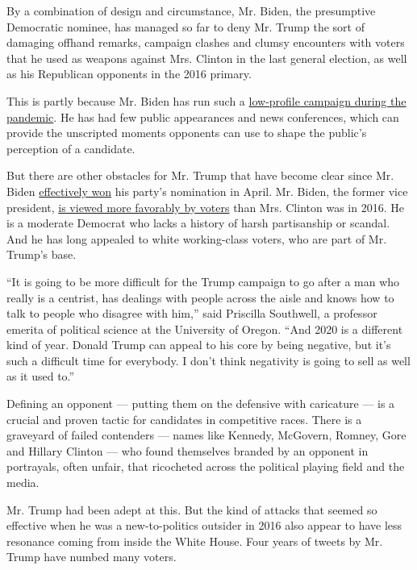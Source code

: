 By a combination of design and circumstance, Mr. Biden, the presumptive
Democratic nominee, has managed so far to deny Mr. Trump the sort of
damaging offhand remarks, campaign clashes and clumsy encounters with
voters that he used as weapons against Mrs. Clinton in the last general
election, as well as his Republican opponents in the 2016 primary.

This is partly because Mr. Biden has run such a
\href{https://www.nytimes3xbfgragh.onion/2020/06/25/us/politics/biden-speech-trump-coronavirus.html}{low-profile
campaign during the pandemic}. He has had few public appearances and
news conferences, which can provide the unscripted moments opponents can
use to shape the public's perception of a candidate.

But there are other obstacles for Mr. Trump that have become clear since
Mr. Biden
\href{https://www.nytimes3xbfgragh.onion/2020/04/08/us/politics/bernie-sanders-drops-out.html}{effectively
won} his party's nomination in April. Mr. Biden, the former vice
president,
\href{https://www.nytimes3xbfgragh.onion/2020/06/24/us/politics/trump-biden-poll-nyt-upshot-siena-college.html}{is
viewed more favorably by voters} than Mrs. Clinton was in 2016. He is a
moderate Democrat who lacks a history of harsh partisanship or scandal.
And he has long appealed to white working-class voters, who are part of
Mr. Trump's base.

``It is going to be more difficult for the Trump campaign to go after a
man who really is a centrist, has dealings with people across the aisle
and knows how to talk to people who disagree with him,'' said Priscilla
Southwell, a professor emerita of political science at the University of
Oregon. ``And 2020 is a different kind of year. Donald Trump can appeal
to his core by being negative, but it's such a difficult time for
everybody. I don't think negativity is going to sell as well as it used
to.''

Defining an opponent --- putting them on the defensive with caricature
--- is a crucial and proven tactic for candidates in competitive races.
There is a graveyard of failed contenders --- names like Kennedy,
McGovern, Romney, Gore and Hillary Clinton --- who found themselves
branded by an opponent in portrayals, often unfair, that ricocheted
across the political playing field and the media.

Mr. Trump had been adept at this. But the kind of attacks that seemed so
effective when he was a new-to-politics outsider in 2016 also appear to
have less resonance coming from inside the White House. Four years of
tweets by Mr. Trump have numbed many voters.

